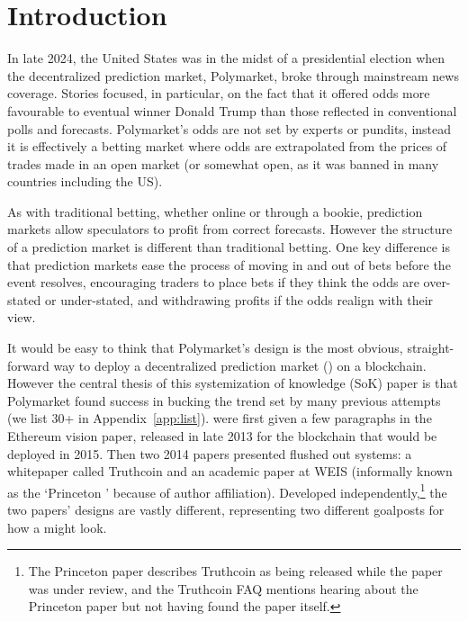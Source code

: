 \section{Introduction}

In late 2024, the United States was in the midst of a presidential election when the decentralized prediction market, Polymarket, broke through mainstream news coverage. Stories focused, in particular, on the fact that it offered odds more favourable to eventual winner Donald Trump than those reflected in conventional polls and forecasts. Polymarket's odds are not set by experts or pundits, instead it is effectively a betting market where odds are extrapolated from the prices of trades made in an open market (or somewhat open, as it was banned in many countries including the US). 

As with traditional betting, whether online or through a bookie, prediction markets allow speculators to profit from correct forecasts. However the structure of a prediction market is different than traditional betting. One key difference is that prediction markets ease the process of moving in and out of bets before the event resolves, encouraging traders to place bets if they think the odds are over-stated or under-stated, and withdrawing profits if the odds realign with their view. 

It would be easy to think that Polymarket's design is the most obvious, straight-forward way to deploy a decentralized prediction market (\depm) on a blockchain. However the central thesis of this systemization of knowledge (SoK) paper is that Polymarket found success in bucking the trend set by many previous attempts (we list 30+ \depms in Appendix~\ref{app:list}). \depms were first given a few paragraphs in the Ethereum vision paper, released in late 2013 for the blockchain that would be deployed in 2015. Then two 2014 papers presented flushed out systems: a whitepaper called Truthcoin and an academic paper at WEIS (informally known as the `Princeton \depm' because of author affiliation). Developed independently,\footnote{The Princeton paper describes Truthcoin as being released while the paper was under review, and the Truthcoin FAQ mentions hearing about the Princeton paper but not having found the paper itself.} the two papers' designs are vastly different, representing two different goalposts for how a \depm might look. 

